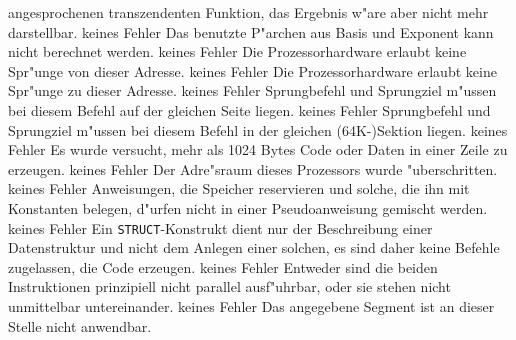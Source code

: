 \documentclass[12pt,a4paper,twoside]{report}
\newcommand{\tty}[1]{{\tt #1}}
\begin{document}
\begin{description}
{                angesprochenen transzendenten Funktion, das Ergebnis
                w"are aber nicht mehr darstellbar.}
               {keines}
               {Fehler}
               {Das benutzte P"archen aus Basis und Exponent
                kann nicht berechnet werden.}
               {keines}
               {Fehler}
               {Die Prozessorhardware erlaubt keine
                Spr"unge von dieser Adresse.}
               {keines}
               {Fehler}
               {Die Prozessorhardware erlaubt keine
                Spr"unge zu dieser Adresse.}
               {keines}
               {Fehler}
               {Sprungbefehl und Sprungziel m"ussen bei diesem
                Befehl auf der gleichen Seite liegen.}
               {keines}
               {Fehler}
               {Sprungbefehl und Sprungziel m"ussen bei diesem
                Befehl in der gleichen (64K-)Sektion liegen.}
               {keines}
               {Fehler}
               {Es wurde versucht, mehr als 1024 Bytes Code oder
                Daten in einer Zeile zu erzeugen.}
               {keines}
               {Fehler}
               {Der Adre"sraum dieses Prozessors wurde
                "uberschritten.}
               {keines}
               {Fehler}
               {Anweisungen, die Speicher reservieren und solche,
                die ihn mit Konstanten belegen, d"urfen nicht in einer
                Pseudoanweisung gemischt werden.}
               {keines}
               {Fehler}
               {Ein \tty{STRUCT}-Konstrukt dient nur der Beschreibung
                einer Datenstruktur und nicht dem Anlegen einer solchen,
                es sind daher keine Befehle zugelassen, die Code erzeugen.}
               {keines}
               {Fehler}
               {Entweder sind die beiden Instruktionen
                prinzipiell nicht parallel ausf"uhrbar, oder sie stehen nicht
                unmittelbar untereinander.}
               {keines}
               {Fehler}
               {Das angegebene Segment ist an dieser Stelle
                nicht anwendbar.}

\end{description}
\end{document}
